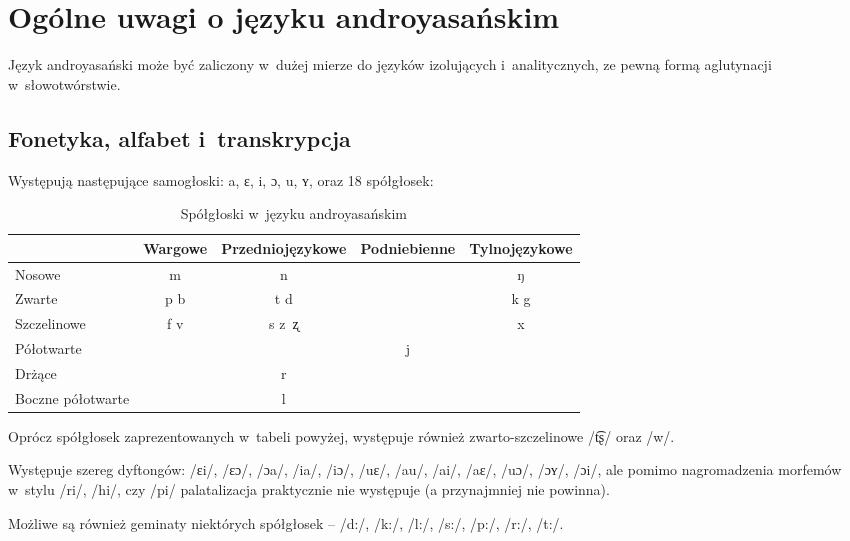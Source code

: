 \section[Ogólne uwagi]{Ogólne uwagi o języku androyasańskim}

\begin{spacing}{1.1}
Język androyasański może być zaliczony w~dużej mierze do języków 
izolujących i~analitycznych, ze pewną formą aglutynacji w~słowotwórstwie.

\subsection{Fonetyka, alfabet i~transkrypcja}

Występują następujące samogłoski: a, ɛ, i, ɔ, u, ʏ, oraz 18 spółgłosek:

\begin{table}[h]
\centering
\caption{Spółgłoski w~języku androyasańskim}
\begin{tabular}{lcccc}\toprule
                  & Wargowe & Przedniojęzykowe & Podniebienne & Tylnojęzykowe \\\midrule
Nosowe            & m       & n                &              & ŋ             \\\midrule
Zwarte            & p b     & t d              &              & k g           \\\midrule
Szczelinowe       & f v     & s z~ʐ            &              & x             \\\midrule
Półotwarte        &         &                  & j            &               \\\midrule
Drżące            &         & r                &              &               \\\midrule
Boczne półotwarte &         & l                &              &               \\\bottomrule
\end{tabular}
\label{tab:consonants}
\end{table}

Oprócz spółgłosek zaprezentowanych w~tabeli powyżej, występuje 
również zwarto-szczelinowe /t͡ʂ/ oraz /w/.

Występuje szereg dyftongów: /ɛi/, /ɛɔ/, /ɔa/, /ia/, /iɔ/, /uɛ/, /au/, /ai/, 
/aɛ/, /uɔ/, /ɔʏ/, /ɔi/, ale pomimo nagromadzenia morfemów w~stylu /ri/, /hi/, 
czy /pi/ palatalizacja praktycznie nie występuje (a przynajmniej nie powinna).

Możliwe są również geminaty niektórych spółgłosek -- /d:/, /k:/, /l:/, /s:/, 
/p:/, /r:/, /t:/.


\end{spacing}
